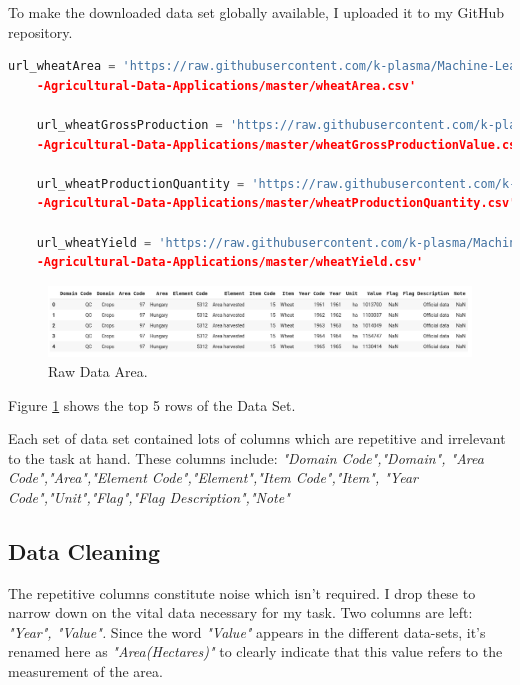 To make the downloaded data set globally available, I uploaded it to my GitHub repository.\cite{adeyemo_2020}

\begin{lstlisting}[language=Python]
	url_wheatArea = 'https://raw.githubusercontent.com/k-plasma/Machine-Learning-Models-for
	-Agricultural-Data-Applications/master/wheatArea.csv'	
	
	url_wheatGrossProduction = 'https://raw.githubusercontent.com/k-plasma/Machine-Learning-Models-for
	-Agricultural-Data-Applications/master/wheatGrossProductionValue.csv'	
	
	url_wheatProductionQuantity = 'https://raw.githubusercontent.com/k-plasma/Machine-Learning-Models-for
	-Agricultural-Data-Applications/master/wheatProductionQuantity.csv'	
	
	url_wheatYield = 'https://raw.githubusercontent.com/k-plasma/Machine-Learning-Models-for
	-Agricultural-Data-Applications/master/wheatYield.csv'
\end{lstlisting}

\begin{figure}[h!]
	\includegraphics[width=\textwidth,height=\textheight,keepaspectratio]{fig/Area_Head.png}
	\caption{Raw Data Area.}
	\label{fig:Areaa_Head1}
\end{figure}

Figure \ref{fig:Areaa_Head1} shows the top 5 rows of the Data Set.


Each set of data set contained lots of columns which are repetitive and irrelevant to the task at hand. These columns include: \textit{"Domain Code","Domain",
	"Area Code","Area","Element Code","Element","Item Code","Item",
	"Year Code","Unit","Flag","Flag Description","Note"}

\subsection{Data Cleaning} 
The repetitive columns constitute noise which isn't required. I drop these to narrow down on the vital data necessary for my task. Two columns are left: \textit{"Year", "Value".} Since the word \textit{"Value"} appears in the different data-sets, it's renamed here as \textit{"Area(Hectares)"} to clearly indicate that this value refers to the measurement of the area.


